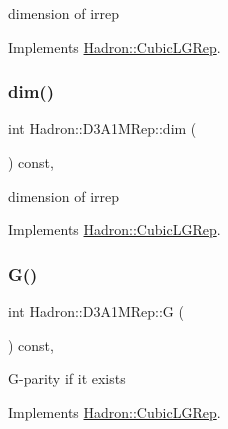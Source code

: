 dimension of irrep 

Implements \mbox{\hyperlink{structHadron_1_1CubicLGRep_a3acbaea26503ed64f20df693a48e4cdd}{Hadron\+::\+Cubic\+L\+G\+Rep}}.

\mbox{\label{structHadron_1_1D3A1MRep_a312d820f56c251d8c64adff115dd1c50}} 
\subsubsection{\texorpdfstring{dim()}{dim()}\hspace{0.1cm}{\footnotesize\ttfamily [3/3]}}
{\footnotesize\ttfamily int Hadron\+::\+D3\+A1\+M\+Rep\+::dim (\begin{DoxyParamCaption}{ }\end{DoxyParamCaption}) const\hspace{0.3cm}{\ttfamily [inline]}, {\ttfamily [virtual]}}

dimension of irrep 

Implements \mbox{\hyperlink{structHadron_1_1CubicLGRep_a3acbaea26503ed64f20df693a48e4cdd}{Hadron\+::\+Cubic\+L\+G\+Rep}}.

\mbox{\label{structHadron_1_1D3A1MRep_aed0335625e2422a4694e6b30fdae9470}} 
\subsubsection{\texorpdfstring{G()}{G()}\hspace{0.1cm}{\footnotesize\ttfamily [1/3]}}
{\footnotesize\ttfamily int Hadron\+::\+D3\+A1\+M\+Rep\+::G (\begin{DoxyParamCaption}{ }\end{DoxyParamCaption}) const\hspace{0.3cm}{\ttfamily [inline]}, {\ttfamily [virtual]}}

G-\/parity if it exists 

Implements \mbox{\hyperlink{structHadron_1_1CubicLGRep_ace26f7b2d55e3a668a14cb9026da5231}{Hadron\+::\+Cubic\+L\+G\+Rep}}.

\mbox{\label{structHadron_1_1D3A1MRep_aed0335625e2422a4694e6b30fdae9470}} 

